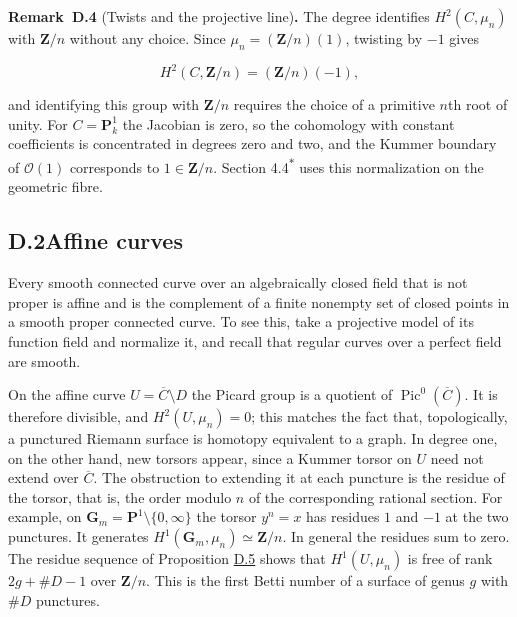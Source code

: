 \documentclass[11pt]{article}
\newenvironment{bpstatement}[2]{\par\addvspace{0.6\baselineskip}\noindent\textbf{#1}#2\textbf{.}\enspace\ignorespaces}
  {\par\addvspace{0.4\baselineskip}}
\newcommand{\bpout}[1]{#1\textsuperscript{\hyperlink{bp-outside}{\ensuremath{\ast}}}}
\begin{document}
\label{bp12}%
\begin{bpstatement}{Remark~D.4}{ (Twists and the projective line)}
The degree identifies \(H^2(C,\mu_n)\) with \(\mathbf Z/n\) without any choice. Since \(\mu_n=(\mathbf Z/n)(1)\), twisting by \(-1\) gives

\[
H^2(C,\mathbf Z/n)=(\mathbf Z/n)(-1),
\]

and identifying this group with \(\mathbf Z/n\) requires the choice of a primitive \(n\)th root of unity.  For \(C=\mathbf P^1_k\) the Jacobian is zero, so the cohomology with constant coefficients is concentrated in degrees zero and two, and the Kummer boundary of \(\mathcal O(1)\) corresponds to \(1\in\mathbf Z/n\). Section \bpout{4.4} uses this normalization on the geometric fibre.
\end{bpstatement}


\subsection*{\texorpdfstring{D.2\quad Affine curves}{D.2 Affine curves}}
\label{bp13}%
\label{bp14}%
Every smooth connected curve over an algebraically closed field that is not proper is affine and is the complement of a finite nonempty set of closed points in a smooth proper connected curve.  To see this, take a projective model of its function field and normalize it, and recall that regular curves over a perfect field are smooth.

On the affine curve \(U=\overline C\setminus D\) the Picard group is a quotient of \(\operatorname{Pic}^0(\overline C)\). It is therefore divisible, and \(H^2(U,\mu_n)=0\); this matches the fact that, topologically, a punctured Riemann surface is homotopy equivalent to a graph. In degree one, on the other hand, new torsors appear, since a Kummer torsor on \(U\) need not extend over \(\overline C\). The obstruction to extending it at each puncture is the residue of the torsor, that is, the order modulo \(n\) of the corresponding rational section. For example, on \(\mathbf G_m=\mathbf P^1\setminus\{0,\infty\}\) the torsor \(y^n=x\) has residues \(1\) and \(-1\) at the two punctures. It generates \(H^1(\mathbf G_m,\mu_n)\simeq\mathbf Z/n\). In general the residues sum to zero. The residue sequence of Proposition \hyperref[bp15]{D.5} shows that \(H^1(U,\mu_n)\) is free of rank \(2g+\#D-1\) over \(\mathbf Z/n\). This is the first Betti number of a surface of genus \(g\) with \(\#D\) punctures.
\end{document}
